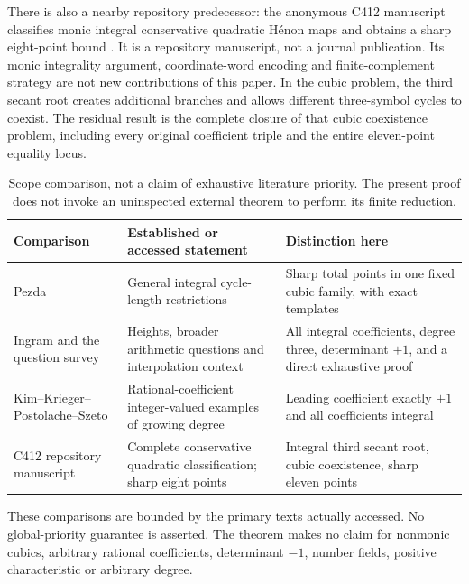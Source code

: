 There is also a nearby repository predecessor: the anonymous C412
manuscript classifies monic integral conservative quadratic H\'enon
maps and obtains a sharp eight-point bound
\citep{c412repository2026}. It is a repository manuscript, not a
journal publication. Its monic integrality argument, coordinate-word
encoding and finite-complement strategy are not new contributions of
this paper. In the cubic problem, the third secant root creates
additional branches and allows different three-symbol cycles to
coexist. The residual result is the complete closure of that cubic
coexistence problem, including every original coefficient triple and
the entire eleven-point equality locus.

\begin{table}[htbp]
\centering\small
\begin{tabular}{@{}>{\raggedright\arraybackslash}p{3.2cm}
 >{\raggedright\arraybackslash}p{5.5cm}
 >{\raggedright\arraybackslash}p{6.2cm}@{}}
\toprule
Comparison & Established or accessed statement & Distinction here\\
\midrule
Pezda & General integral cycle-length restrictions & Sharp total
points in one fixed cubic family, with exact templates\\
Ingram and the question survey & Heights, broader arithmetic questions
and interpolation context & All integral coefficients, degree three,
determinant $+1$, and a direct exhaustive proof\\
Kim--Krieger--Postolache--Szeto & Rational-coefficient integer-valued
examples of growing degree & Leading coefficient exactly $+1$ and
all coefficients integral\\
C412 repository manuscript & Complete conservative quadratic
classification; sharp eight points & Integral third secant root,
cubic coexistence, sharp eleven points\\
\bottomrule
\end{tabular}
\caption{Scope comparison, not a claim of exhaustive literature
priority. The present proof does not invoke an uninspected external
theorem to perform its finite reduction.}
\label{tab:source-comparison}
\end{table}

These comparisons are bounded by the primary texts actually accessed.
No global-priority guarantee is asserted. The theorem makes no claim
for nonmonic cubics, arbitrary rational coefficients, determinant
$-1$, number fields, positive characteristic or arbitrary degree.
